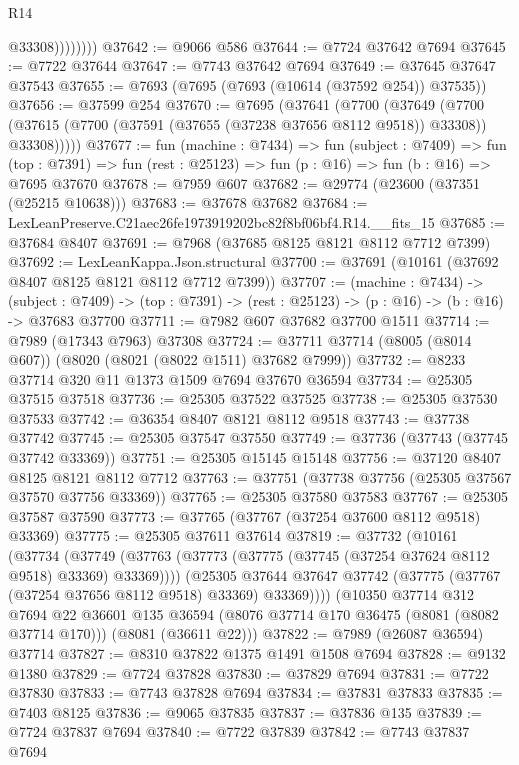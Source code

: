 \begin{lexlean}{R14}
\begin{coremodule}
                    @33308))))))))
@37642 := @9066 @586
@37644 := @7724 @37642 @7694
@37645 := @7722 @37644
@37647 := @7743 @37642 @7694
@37649 := @37645 @37647 @37543
@37655 := @7693 (@7695 (@7693 (@10614 (@37592 @254)) @37535))
@37656 := @37599 @254
@37670 := @7695
    (@37641
      (@7700
        (@37649
          (@7700 (@37615 (@7700 (@37591 (@37655 (@37238 @37656 @8112 @9518)) @33308)) @33308)))))
@37677 := fun (machine : @7434) =>
  fun (subject : @7409) =>
  fun (top : @7391) => fun (rest : @25123) => fun (p : @16) => fun (b : @16) => @7695 @37670
@37678 := @7959 @607
@37682 := @29774 (@23600 (@37351 (@25215 @10638)))
@37683 := @37678 @37682
@37684 := LexLeanPreserve.C21aec26fe1973919202bc82f8bf06bf4.R14.__fits_15
@37685 := @37684 @8407
@37691 := @7968 (@37685 @8125 @8121 @8112 @7712 @7399)
@37692 := LexLeanKappa.Json.structural
@37700 := @37691 (@10161 (@37692 @8407 @8125 @8121 @8112 @7712 @7399))
@37707 := (machine : @7434) ->
  (subject : @7409) -> (top : @7391) -> (rest : @25123) -> (p : @16) -> (b : @16) -> @37683 @37700
@37711 := @7982 @607 @37682 @37700 @1511
@37714 := @7989 (@17343 @7963) @37308
@37724 := @37711 @37714 (@8005 (@8014 @607)) (@8020 (@8021 (@8022 @1511) @37682 @7999))
@37732 := @8233 @37714 @320 @11 @1373 @1509 @7694 @37670 @36594
@37734 := @25305 @37515 @37518
@37736 := @25305 @37522 @37525
@37738 := @25305 @37530 @37533
@37742 := @36354 @8407 @8121 @8112 @9518
@37743 := @37738 @37742
@37745 := @25305 @37547 @37550
@37749 := @37736 (@37743 (@37745 @37742 @33369))
@37751 := @25305 @15145 @15148
@37756 := @37120 @8407 @8125 @8121 @8112 @7712
@37763 := @37751 (@37738 @37756 (@25305 @37567 @37570 @37756 @33369))
@37765 := @25305 @37580 @37583
@37767 := @25305 @37587 @37590
@37773 := @37765 (@37767 (@37254 @37600 @8112 @9518) @33369)
@37775 := @25305 @37611 @37614
@37819 := @37732
    (@10161
      (@37734
        (@37749 (@37763 (@37773 (@37775 (@37745 (@37254 @37624 @8112 @9518) @33369) @33369))))
        (@25305 @37644 @37647 @37742 (@37775 (@37767 (@37254 @37656 @8112 @9518) @33369) @33369))))
    (@10350
      @37714
      @312
      @7694
      @22
      @36601
      @135
      @36594
      (@8076 @37714 @170 @36475 (@8081 (@8082 @37714 @170)))
      (@8081 (@36611 @22)))
@37822 := @7989 (@26087 @36594) @37714
@37827 := @8310 @37822 @1375 @1491 @1508 @7694
@37828 := @9132 @1380
@37829 := @7724 @37828
@37830 := @37829 @7694
@37831 := @7722 @37830
@37833 := @7743 @37828 @7694
@37834 := @37831 @37833
@37835 := @7403 @8125
@37836 := @9065 @37835
@37837 := @37836 @135
@37839 := @7724 @37837 @7694
@37840 := @7722 @37839
@37842 := @7743 @37837 @7694

\end{coremodule}
\end{lexlean}
